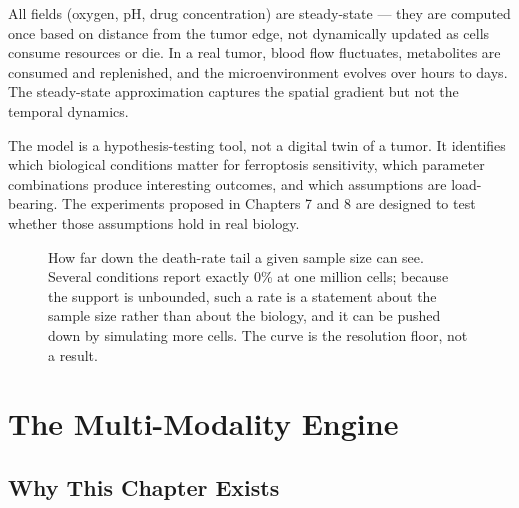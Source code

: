 \documentclass[11pt,twoside,openright]{report}
\begin{document}
All fields (oxygen, pH, drug concentration) are steady-state --- they are computed once based on distance from the tumor edge, not dynamically updated as cells consume resources or die. In a real tumor, blood flow fluctuates, metabolites are consumed and replenished, and the microenvironment evolves over hours to days. The steady-state approximation captures the spatial gradient but not the temporal dynamics.

The model is a hypothesis-testing tool, not a digital twin of a tumor. It identifies which biological conditions matter for ferroptosis sensitivity, which parameter combinations produce interesting outcomes, and which assumptions are load-bearing. The experiments proposed in Chapters 7 and 8 are designed to test whether those assumptions hold in real biology.

\begin{figure}[tbp]
\setcounter{figure}{28}
\caption{How far down the death-rate tail a given sample size can see. Several conditions report exactly 0\% at one million cells; because the support is unbounded, such a rate is a statement about the sample size rather than about the biology, and it can be pushed down by simulating more cells. The curve is the resolution floor, not a result.}
\label{fig:fig29_rare_event_resolution}
\end{figure}

\chapter{The Multi-Modality Engine}


\section{Why This Chapter Exists}

\end{document}
